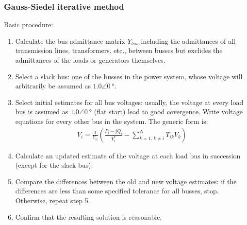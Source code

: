 \subsubsection{Gauss-Siedel iterative method}
Basic procedure:
\begin{enumerate}
	\item Calculate the bus admittance matrix $Y_{bus}$ including the admittances of all transmission lines, transformers, etc., between busses but exclides the admittances of the loads or generators themselves.
	\item Select a slack bus: one of the busses in the power system, whose voltage will arbitrarily be assumed as $1.0\angle\SI{0}{\degree}$.
	\item Select initial estimates for all bus voltages: usually, the voltage at every load bus is assumed as $1.0\angle\SI{0}{\degree}$ (flat start) lead to good covergence. Write voltage equations for every other bus in the system. The generic form is:
	\begin{gather}
		V_i = \frac{1}{Y_{ii}}\left(\frac{P_i-jQ_i}{V_i^*}-\sum^N_{k=1,\,k\neq i}T_{ik}V_k\right)
	\end{gather}
	\item Calculate an updated estimate of the voltage at each load bus in succession (except for the slack bus).
	\item Compare the differences between the old and new voltage estimates: if the differences are less than some specified tolerance for all busses, stop. Otherwise, repeat step 5.
	\item Confirm that the resulting solution is reasonable.
\end{enumerate}
